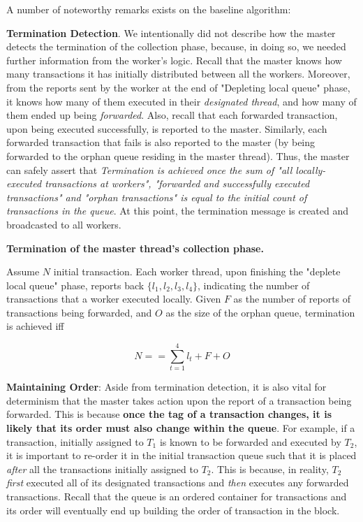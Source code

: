 A number of noteworthy remarks exists on the baseline algorithm:

\textbf{Termination Detection}. We intentionally did not describe how the master detects the
termination of the collection phase, because, in doing so, we needed further information from the
worker's logic. Recall that the master knows how many transactions it has initially
distributed between all the workers. Moreover, from the reports sent by the worker at the end of
"Depleting local queue" phase, it knows how many of them executed in their \textit{designated
thread}, and how many of them ended up being \textit{forwarded}. Also, recall that each forwarded
transaction, upon being executed successfully, is reported to the master. Similarly, each forwarded
transaction that fails is also reported to the master (by being forwarded to the orphan queue
residing in the master thread). Thus, the master can safely assert that \textit{Termination is achieved once
the sum of "all locally-executed transactions at workers", "forwarded and successfully executed
transactions" and "orphan transactions" is equal to the initial count of transactions in the queue}.
At this point, the termination message is created and broadcasted to all workers.

\begin{definition}
	\textbf{Termination of the master thread's collection phase. }

	Assume $N$ initial transaction. Each worker thread, upon finishing the "deplete local queue"
	phase, reports back $\{ l_{1}, l_{2}, l_{3}, l_{4} \}$, indicating the number of transactions
	that a worker executed locally. Given $F$ as the number of reports of transactions being
	forwarded, and $O$ as the size of the orphan queue, termination is achieved iff

	\begin{equation}
		N == \sum_{t = 1}^{4} l_{t} + F + O
	\end{equation}
\end{definition}


\textbf{Maintaining Order}: Aside from termination detection, it is also vital for determinism that
the master takes action upon the report of a transaction being forwarded. This is because
\textbf{once the tag of a transaction changes, it is likely that its order must also change within
the queue}. For example, if a transaction, initially assigned to $T_{1}$ is known to be forwarded
and executed by $T_{2}$, it is important to re-order it in the initial transaction queue such that
it is placed \textit{after} all the transactions initially assigned to $T_{2}$. This is because, in
reality, $T_{2}$ \textit{first} executed all of its designated transactions and \textit{then}
executes any forwarded transactions. Recall that the queue is an ordered container for transactions
and its order will eventually end up building the order of transaction in the block.

